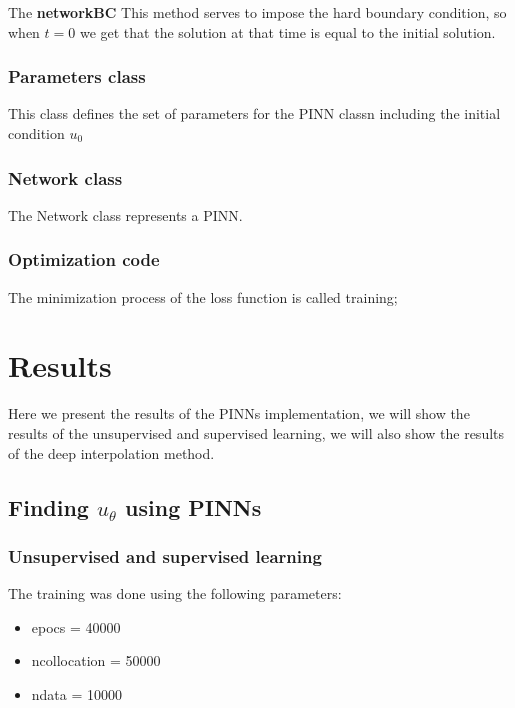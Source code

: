 \documentclass{article}
\begin{document}
The \textbf{networkBC} This method serves to impose the hard boundary condition, so when $t=0$ we get that the solution at that time is equal to the initial solution. 

\subsubsection{Parameters class}

This class defines the set of parameters for the PINN classn including the initial condition $u_0$ 

\subsubsection{Network class}

The Network class represents a PINN.


\subsubsection{Optimization code}

The minimization process of the loss function is called training;

\section{Results}
Here we present the results of the PINNs implementation, we will show the results of the unsupervised and supervised learning, we will also show the results of the deep interpolation method.

\subsection{Finding $u_\theta$ using PINNs}

\subsubsection{Unsupervised and supervised learning}

The training was done using the following parameters:

\begin{itemize}
   \item epocs = 40000
   \item ncollocation = 50000
   \item ndata = 10000
\end{itemize}
\end{document}
